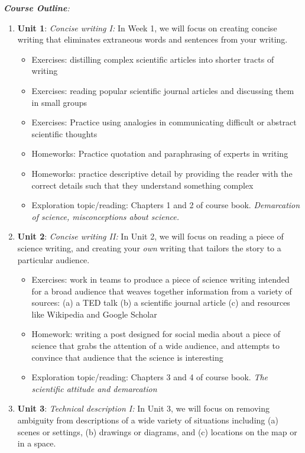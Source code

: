 \documentclass[10pt]{article}
\begin{document}
\textit{\textbf{Course Outline}:}
\begin{enumerate}
\item \textbf{Unit 1}: \textit{Concise writing I:} In Week 1, we will focus on creating concise writing that eliminates extraneous words and sentences from your writing.
\begin{itemize}
\item Exercises: distilling complex scientific articles into shorter tracts of writing
\item Exercises: reading popular scientific journal articles and discussing them in small groups
\item Exercises: Practice using analogies in communicating difficult or abstract scientific thoughts
\item Homeworks: Practice quotation and paraphrasing of experts in writing
\item Homeworks: practice descriptive detail by providing the reader with the correct details such that they understand something complex
\item Exploration topic/reading: Chapters 1 and 2 of course book.  \textit{Demarcation of science, misconceptions about science.}
\end{itemize}
\item \textbf{Unit 2}: \textit{Concise writing II:} In Unit 2, we will focus on reading a piece of science writing, and creating your \textit{own} writing that tailors the story to a particular audience.
\begin{itemize}
\item Exercises: work in teams to produce a piece of science writing intended for a broad audience that weaves together information from a variety of sources: (a) a TED talk (b) a scientific journal article (c) and resources like Wikipedia and Google Scholar
\item Homework: writing a post designed for social media about a piece of science that grabs the attention of a wide audience, and attempts to convince that audience that the science is interesting
\item Exploration topic/reading: Chapters 3 and 4 of course book. \textit{The scientific attitude and demarcation}
\end{itemize}
\item \textbf{Unit 3}: \textit{Technical description I:} In Unit 3, we will focus on removing ambiguity from descriptions of a wide variety of situations including (a) scenes or settings, (b) drawings or diagrams, and (c) locations on the map or in a space.

\end{enumerate}
\end{document}
